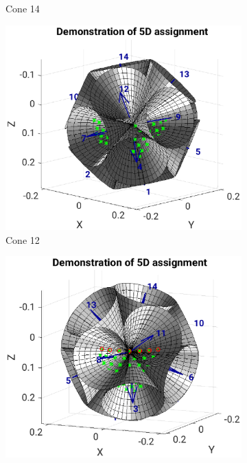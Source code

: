 \begin{figure}[H]
\begin{subfigure}[b]{0.49\textwidth}
         \caption{Cone 14}
         \label{fig:res:5th_4th_cones14}
     \end{subfigure}
     \hfill
     \begin{subfigure}[b]{0.49\textwidth}
         \centering
         \includegraphics[width=1.3\textwidth]{Graphics/Results/4d_5d/5thDim_over_4thDim_150_150_150_cones_7_9_center.eps}
         \caption{Cone 12}
         \label{fig:res:5th_4th_cones12}
     \end{subfigure}
     \hfill
     \begin{subfigure}[b]{0.49\textwidth}
         \centering
         \includegraphics[width=1.3\textwidth]{Graphics/Results/4d_5d/5thDim_over_4thDim_150_150_150_cones_8_11_center.eps}

\end{subfigure}
\end{figure}
